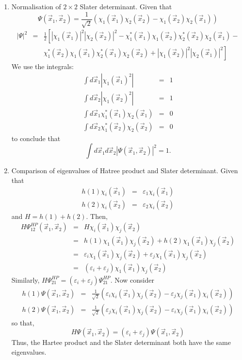 \begin{enumerate}
\item\label{c2p3} Normalisation of $2 \times 2$ Slater determinant.
Given that
\[
\Psi(\vec{x}_1, \vec{x}_2) = \frac{1}{\sqrt{2}}
(\chi_1(\vec{x}_1)\chi_2(\vec{x}_2) -\chi_1(\vec{x}_2)\chi_2(\vec{x}_1))
\]
\begin{eqnarray*}
|\Psi|^2 &=& \frac{1}{2}\left[|\chi_1(\vec{x}_1)|^2|\chi_2(\vec{x}_2)|^2 -
\chi_1^\ast(\vec{x}_1)\chi_1(\vec{x}_2)\chi_2^\ast(\vec{x}_2)\chi_2(\vec{x}_1)
 - \right. \\
& & \left.
\chi_1^\ast(\vec{x}_2)\chi_1(\vec{x}_1)\chi_2^\ast(\vec{x}_1)\chi_2(\vec{x}_2)
+ |\chi_1(\vec{x}_2)|^2|\chi_2(\vec{x}_1)|^2\right]
\end{eqnarray*}
We use the integrals:
\begin{eqnarray*}
\int d\vec{x}_1|\chi_1(\vec{x}_1)^2| &=& 1 \\
\int d\vec{x}_2|\chi_1(\vec{x}_2)^2| &=& 1 \\
\int d\vec{x}_1 \chi_1^\ast(\vec{x}_1)\chi_2(\vec{x}_1) &=& 0 \\
\int d\vec{x}_2 \chi_1^\ast(\vec{x}_2)\chi_2(\vec{x}_2) &=& 0 
\end{eqnarray*}
to conclude that 
\[
\int d\vec{x}_1 d\vec{x}_2 |\Psi(\vec{x}_1, \vec{x}_2)|^2 = 1.
\]

\item\label{c2p4} Comparison of eigenvalues of Hatree product and Slater
determinant.
Given that
\begin{eqnarray*}
h(1)\chi_i(\vec{x}_1) &=& \varepsilon_1\chi_i(\vec{x}_1) \\
h(2)\chi_i(\vec{x}_2) &=& \varepsilon_2\chi_i(\vec{x}_2) 
\end{eqnarray*}
and $H = h(1) + h(2)$. Then,
\begin{eqnarray*}
H\Psi^{HP}_{12}(\vec{x}_1, \vec{x}_2) &=& H\chi_i(\vec{x}_1)\chi_j(\vec{x}_2) \\
 &=& h(1)\chi_1(\vec{x}_1)\chi_j(\vec{x}_2) +
     h(2)\chi_1(\vec{x}_1)\chi_j(\vec{x}_2) \\
 &=& \varepsilon_i\chi_1(\vec{x}_1)\chi_j(\vec{x}_2) +
     \varepsilon_j\chi_1(\vec{x}_1)\chi_j(\vec{x}_2) \\
 &=& (\varepsilon_i + \varepsilon_j)\chi_1(\vec{x}_1)\chi_j(\vec{x}_2)
\end{eqnarray*}
Similarly, $H\Psi^{HP}_{21} = (\varepsilon_i + \varepsilon_j)\Psi^{HP}_{21}$.
Now consider
\begin{eqnarray*}
h(1)\Psi(\vec{x}_1, \vec{x}_2) &=& \frac{1}{\sqrt{2}}
(\varepsilon_i\chi_i(\vec{x}_1)\chi_j(\vec{x}_2) - 
\varepsilon_j\chi_j(\vec{x}_1)\chi_i(\vec{x}_2)) \\
h(2)\Psi(\vec{x}_1, \vec{x}_2) &=& \frac{1}{\sqrt{2}}
(\varepsilon_j\chi_i(\vec{x}_1)\chi_j(\vec{x}_2) - 
\varepsilon_i\chi_j(\vec{x}_1)\chi_i(\vec{x}_2)) 
\end{eqnarray*}
so that,
\[
H\Psi(\vec{x}_1, \vec{x}_2) = (\varepsilon_i + \varepsilon_j)
\Psi(\vec{x}_1, \vec{x}_2)
\]
Thus, the Hartee product and the Slater determinant both have the same 
eigenvalues.


\end{enumerate}
